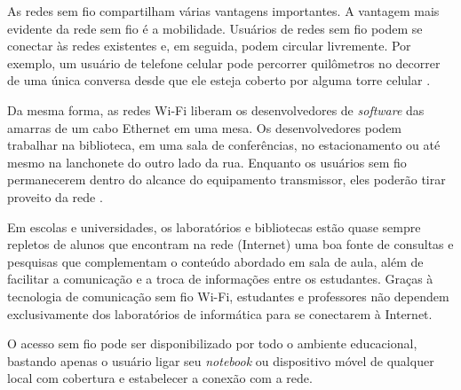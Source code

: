 As redes sem fio compartilham várias vantagens importantes. A vantagem mais evidente da rede sem fio é a mobilidade. Usuários de redes sem fio podem se conectar às redes existentes e, em seguida, podem circular livremente. Por exemplo, um usuário de telefone celular pode percorrer quilômetros no decorrer de uma única conversa desde que ele esteja coberto por alguma torre celular \cite{gast2002}.

Da mesma forma, as redes Wi-Fi liberam os desenvolvedores de \textit{software} das amarras de um cabo Ethernet em uma mesa. Os desenvolvedores podem trabalhar na biblioteca, em uma sala de conferências, no estacionamento ou até mesmo na lanchonete do outro lado da rua. Enquanto os usuários sem fio permanecerem dentro do alcance do equipamento transmissor, eles poderão tirar proveito da rede \cite{gast2002}.

Em escolas e universidades, os laboratórios e bibliotecas estão quase sempre repletos de alunos que encontram na rede (Internet) uma boa fonte de consultas e pesquisas que complementam o conteúdo abordado em sala de aula, além de facilitar a comunicação e a troca de informações entre os estudantes. Graças à tecnologia de comunicação sem fio Wi-Fi, estudantes e professores não dependem exclusivamente dos laboratórios de informática para se conectarem à Internet.

O acesso sem fio pode ser disponibilizado por todo o ambiente educacional, bastando apenas o usuário ligar seu \textit{notebook} ou dispositivo móvel de qualquer local com cobertura e estabelecer a conexão com a rede.



